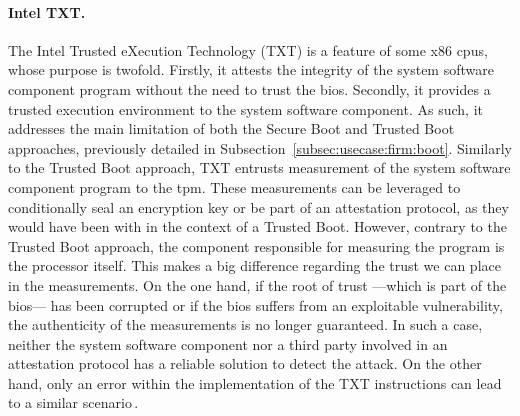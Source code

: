 \paragraph{Intel TXT.}
%
The Intel Trusted eXecution Technology (TXT)\cite{intel2015txt} is a feature of
some x86 \acp{cpu}, whose purpose is twofold.
%
Firstly, it attests the integrity of the system software component program
without the need to trust the \ac{bios}.
%
Secondly, it provides a trusted execution environment to the system software
component.
%
As such, it addresses the main limitation of both the Secure Boot and Trusted
Boot approaches, previously detailed in
Subsection~\ref{subsec:usecase:firm:boot}.
%
Similarly to the Trusted Boot approach, TXT entrusts measurement of the system
software component program to the \ac{tpm}.
%
These measurements can be leveraged to conditionally seal an encryption key or
be part of an attestation protocol, as they would have been with in the context
of a Trusted Boot.
%
However, contrary to the Trusted Boot approach, the component responsible for
measuring the program is the processor itself.
%
This makes a big difference regarding the trust we can place in the
measurements.
%
On the one hand, if the root of trust ---which is part of the \ac{bios}--- has
been corrupted or if the \ac{bios} suffers from an exploitable vulnerability,
the authenticity of the measurements is no longer guaranteed.
%
In such a case, neither the system software component nor a third party involved
in an attestation protocol has a reliable solution to detect the attack.
%
On the other hand, only an error within the implementation of the TXT
instructions can lead to a similar scenario\,\cite{wojtczuk2011txtbug}. 

